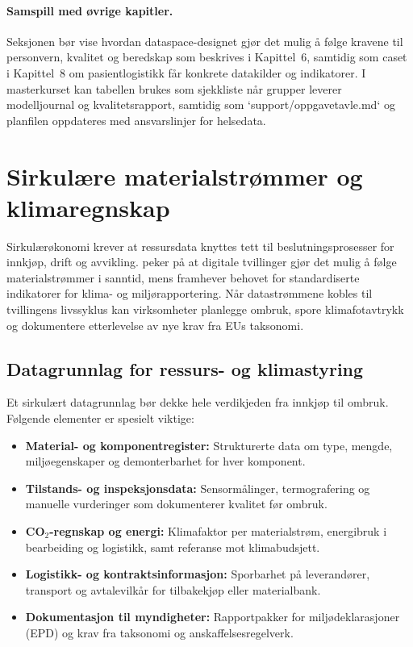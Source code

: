 \paragraph{Samspill med øvrige kapitler.} Seksjonen bør vise hvordan dataspace-designet gjør det mulig å følge kravene til
personvern, kvalitet og beredskap som beskrives i Kapittel~6, samtidig som caset i Kapittel~8 om pasientlogistikk får konkrete
datakilder og indikatorer. I masterkurset kan tabellen brukes som sjekkliste når grupper leverer modelljournal og kvalitetsrapport,
samtidig som `support/oppgavetavle.md` og planfilen oppdateres med ansvarslinjer for helsedata.

\section{Sirkulære materialstrømmer og klimaregnskap}
Sirkulærøkonomi krever at ressursdata knyttes tett til beslutningsprosesser for innkjøp, drift og avvikling. \citet{norskindustri2023sirkular}
peker på at digitale tvillinger gjør det mulig å følge materialstrømmer i sanntid, mens \citet{miljodir2023materialstrommer} framhever
behovet for standardiserte indikatorer for klima- og miljørapportering. Når datastrømmene kobles til tvillingens livssyklus kan
virksomheter planlegge ombruk, spore klimafotavtrykk og dokumentere etterlevelse av nye krav fra EUs taksonomi.

\subsection{Datagrunnlag for ressurs- og klimastyring}
Et sirkulært datagrunnlag bør dekke hele verdikjeden fra innkjøp til ombruk. Følgende elementer er spesielt viktige:
\begin{itemize}
    \item \textbf{Material- og komponentregister:} Strukturerte data om type, mengde, miljøegenskaper og demonterbarhet for hver komponent.
    \item \textbf{Tilstands- og inspeksjonsdata:} Sensormålinger, termografering og manuelle vurderinger som dokumenterer kvalitet før ombruk.
    \item \textbf{CO$_2$-regnskap og energi:} Klimafaktor per materialstrøm, energibruk i bearbeiding og logistikk, samt referanse mot klimabudsjett.
    \item \textbf{Logistikk- og kontraktsinformasjon:} Sporbarhet på leverandører, transport og avtalevilkår for tilbakekjøp eller materialbank.
    \item \textbf{Dokumentasjon til myndigheter:} Rapportpakker for miljødeklarasjoner (EPD) og krav fra taksonomi og anskaffelsesregelverk.
\end{itemize}

